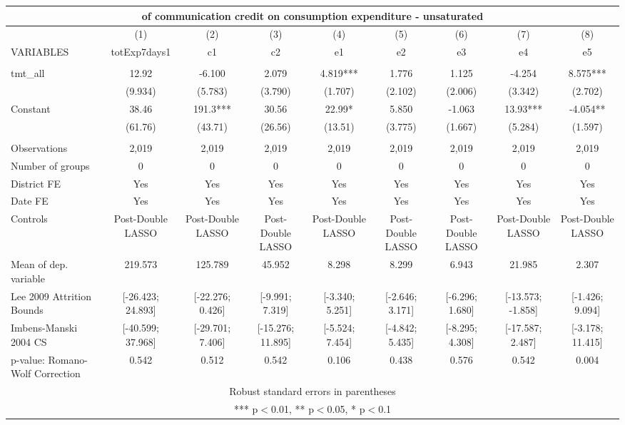 \documentclass[]{article}
\begin{document}
\begin{tabular}{lcccccccc}
\multicolumn{9}{c}{ of communication credit on consumption expenditure - unsaturated} \\ \hline
 & (1) & (2) & (3) & (4) & (5) & (6) & (7) & (8) \\
VARIABLES & totExp7days1 & c1 & c2 & e1 & e2 & e3 & e4 & e5 \\ \hline
 &  &  &  &  &  &  &  &  \\
tmt\_all & 12.92 & -6.100 & 2.079 & 4.819*** & 1.776 & 1.125 & -4.254 & 8.575*** \\
 & (9.934) & (5.783) & (3.790) & (1.707) & (2.102) & (2.006) & (3.342) & (2.702) \\
Constant & 38.46 & 191.3*** & 30.56 & 22.99* & 5.850 & -1.063 & 13.93*** & -4.054** \\
 & (61.76) & (43.71) & (26.56) & (13.51) & (3.775) & (1.667) & (5.284) & (1.597) \\
 &  &  &  &  &  &  &  &  \\
Observations & 2,019 & 2,019 & 2,019 & 2,019 & 2,019 & 2,019 & 2,019 & 2,019 \\
Number of groups & 0 & 0 & 0 & 0 & 0 & 0 & 0 & 0 \\
District FE & Yes & Yes & Yes & Yes & Yes & Yes & Yes & Yes \\
Date FE & Yes & Yes & Yes & Yes & Yes & Yes & Yes & Yes \\
Controls & Post-Double LASSO & Post-Double LASSO & Post-Double LASSO & Post-Double LASSO & Post-Double LASSO & Post-Double LASSO & Post-Double LASSO & Post-Double LASSO \\
Mean of dep. variable & 219.573 & 125.789 & 45.952 & 8.298 & 8.299 & 6.943 & 21.985 & 2.307 \\
Lee 2009 Attrition Bounds & [-26.423; 24.893] & [-22.276; 0.426] & [-9.991; 7.319] & [-3.340; 5.251] & [-2.646; 3.171] & [-6.296; 1.680] & [-13.573; -1.858] & [-1.426; 9.094] \\
Imbens-Manski 2004 CS & [-40.599; 37.968] & [-29.701; 7.406] & [-15.276; 11.895] & [-5.524; 7.454] & [-4.842; 5.435] & [-8.295; 4.308] & [-17.587; 2.487] & [-3.178; 11.415] \\
 p-value: Romano-Wolf Correction & 0.542 & 0.512 & 0.542 & 0.106 & 0.438 & 0.576 & 0.542 & 0.004 \\ \hline
\multicolumn{9}{c}{ Robust standard errors in parentheses} \\
\multicolumn{9}{c}{ *** p$<$0.01, ** p$<$0.05, * p$<$0.1} \\
\end{tabular}
\end{document}

